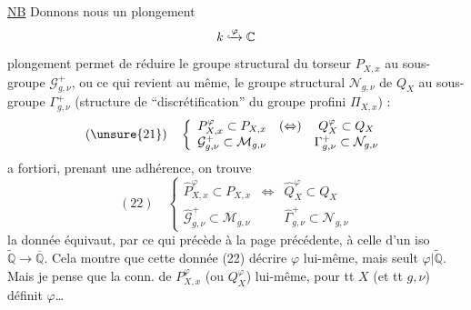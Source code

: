 \uline{NB} Donnons nous un plongement
\[k\lhook\joinrel\xrightarrow{\varphi}\mathbb C\]
 plongement permet de réduire le groupe structural
du torseur $P_{X,x}$  
au sous-groupe $\mathcal G_{g,\nu}^{+}$, ou ce qui revient au même, le groupe
structural $\mathcal N_{g,\nu}$ de $Q_X$ au sous-groupe $\Gamma_{g,\nu}^{+}$
(structure de ``discrétification''  du groupe profini
$\Pi_{X,x}$) : 
\[
(\unsure{21})\quad\left\{\begin{array}{ccc}
P_{X,x}^{\varphi}\subset P_{X,x}&(\Leftrightarrow)&Q_X^{\varphi}\subset Q_X\\
\mathcal G_{g,\nu}^{+}\subset\mathcal M_{g,\nu}&&\Gamma_{g,\nu}^{+}\subset\mathcal N_{g,\nu}
\end{array}\right.
\]
a fortiori, prenant une adhérence, on trouve
\[
(22)\quad\left\{\begin{array}{ccc}
\widehat P_{X,x}^{\varphi}\subset P_{X,x}&\Leftrightarrow&\widehat Q_X^{\varphi}\subset Q_X\\
\widehat{\mathcal G}_{g,\nu}^{+}\subset\mathcal M_{g,\nu}&&\widehat\Gamma_{g,\nu}^{+}\subset\mathcal N_{g,\nu}
\end{array}\right.
\]
 la donnée équivaut, par ce qui précède à la page précédente,
à celle d'un iso  $\widetilde{\mathbb Q}\longrightarrow\overline{\mathbb Q}$.
\unsure{\&} Cela montre que
cette donnée (22)  décrire $\varphi$ lui-même, mais seult
$\varphi|\widetilde{\mathbb Q}$.
Mais je pense que la conn. de \deleted{$\unsure{\varphi}$} $P_{X,x}^{\varphi}$
(ou $Q_X^{\varphi}$) lui-même, pour tt $X$ (et tt $g,\nu$) définit $\varphi$\ldots
{}
